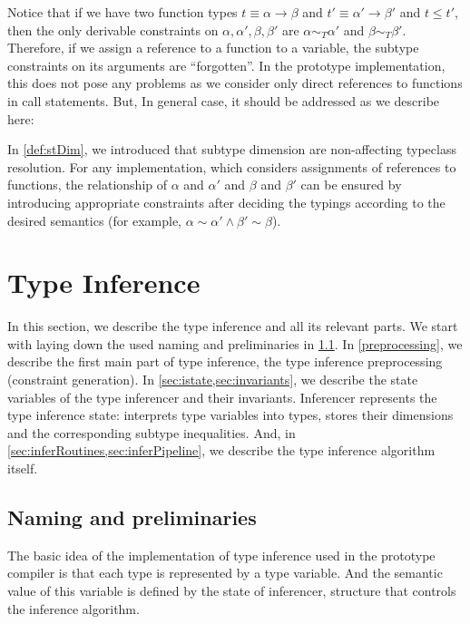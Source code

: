 Notice that if we have two function types $t \equiv \alpha \to \beta$ and $t' \equiv \alpha' \to \beta'$ and $t \leq t'$, then the only derivable constraints on $\alpha, \alpha', \beta, \beta'$ are $\alpha \sim_T \alpha'$ and $\beta \sim_T \beta'$. Therefore, if we assign a reference to a function to a variable, the subtype constraints on its arguments are ``forgotten''. In the prototype implementation, this does not pose any problems as we consider only direct references to functions in call statements. But, In general case, it should be addressed as we describe here:

In \cref{def:stDim}, we introduced that subtype dimension are non-affecting typeclass resolution. For any implementation, which considers assignments of references to functions, the relationship of $\alpha$ and $\alpha'$ and $\beta$ and $\beta'$ can be ensured by introducing appropriate constraints after deciding the typings according to the desired semantics (for example, $\alpha \sim \alpha' \land \beta' \sim \beta$).

\section{Type Inference}
\label{sec:typeInf}

In this section, we describe the type inference and all its relevant parts. We start with laying down the used naming and preliminaries in \cref{sec:namingPrel}. In \cref{preprocessing}, we describe the first main part of type inference, the type inference preprocessing (constraint generation). In \cref{sec:istate,sec:invariants}, we describe the state variables of the type inferencer and their invariants. Inferencer represents the type inference state: interprets type variables into types, stores their dimensions and the corresponding subtype inequalities. And, in \cref{sec:inferRoutines,sec:inferPipeline}, we describe the type inference algorithm itself.

\subsection{Naming and preliminaries}
\label{sec:namingPrel}

The basic idea of the implementation of type inference used in the prototype compiler is that each type is represented by a type variable. And the semantic value of this variable is defined by the state of inferencer, structure that controls the inference algorithm.

